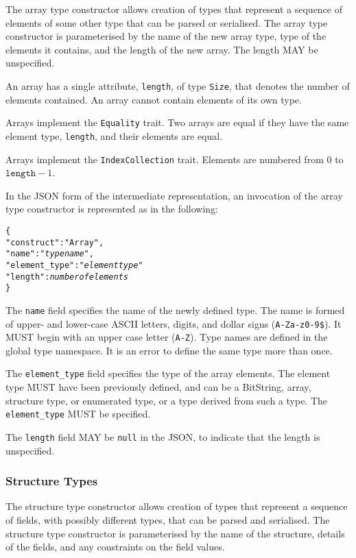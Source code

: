 \documentclass[10pt,twocolumn,a4paper]{article}
\newcommand{\code}[1]{\texttt{#1}}
\begin{document}
The array type constructor allows creation of types that represent a
sequence of elements of some other type that can be parsed or serialised.
The array type constructor is parameterised by the name of the new array
type, type of the elements it contains, and the length of the new array.
The length MAY be unspecified. 

An array has a single attribute, \code{length}, of type \code{Size}, that
denotes the number of elements contained. An array cannot contain elements
of its own type.

Arrays implement the \code{Equality} trait. Two arrays are equal if they
have the same element type, \code{length}, and their elements are equal.

Arrays implement the \code{IndexCollection} trait. Elements are numbered from $0$ to
$\code{length}-1$.

In the JSON form of the intermediate representation, an invocation of the
array type constructor is represented as in the following:
\footnotesize
\begin{alltt}
  \{
    "construct"    : "Array",
    "name"         : "\emph{type name}",
    "element\_type" : "\emph{element type}"
    "length"       : \emph{number of elements}
  \}
\end{alltt}
\normalsize
The \code{name} field specifies the name of the newly defined type. The
name is formed of upper- and lower-case ASCII letters, digits, and dollar
signs (\code{A-Za-z0-9\$}).  It MUST begin with an upper case letter
(\code{A-Z}). Type names are defined in the global type namespace.
It is an error to define the same type more than once.

The \code{element\_type} field specifies the type of the array elements.
The element type MUST have been previously defined, and can be a BitString,
array, structure type, or enumerated type, or a type derived from such a
type. The \code{element\_type} MUST be specified.

The \code{length} field MAY be \code{null} in the JSON, to indicate that
the length is unspecified.

\subsubsection{Structure Types}

The structure type constructor allows creation of types that represent a
sequence of fields, with possibly different types, that can be parsed and
serialised. The structure type constructor is parameterised by the name of
the structure, details of the fields, and any constraints on the field
values.
\end{document}
